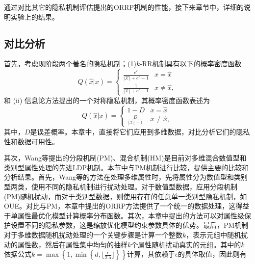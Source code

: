 通过对比其它的隐私机制评估提出的ORRP机制的性能，接下来章节中，详细的说明实验上的结果。

\subsection{对比分析}

首先，考虑现阶段两个著名的隐私机制；(1)$k$-RR\cite{kairouz2016extremal}机制具有以下的概率密度函数
\begin{equation}
	Q(\hat{x}|x)=
	\begin{cases}
		\frac{e^{\epsilon}}{|\mathcal{X}|+e^{\epsilon}-1} & \text{$x=\hat{x}$}\\
		\frac{1}{|\mathcal{X}|+e^{\epsilon}-1} & \text{$x\neq\hat{x}$},
	\end{cases}
\end{equation}
和 (ii) 信息论方法提出的一个对称隐私机制\cite{sarwate2014a,kalantari2018robust}，其概率密度函数表述为
\begin{equation}
	Q(\hat{x}|x)=
	\begin{cases}
		1-D & \text{$x=\hat{x}$}\\
		\frac{D}{|\mathcal{X}|-1} & \text{$x\neq\hat{x}$},
	\end{cases}
\end{equation}
其中，$D$是误差概率。本章中，直接将它们应用到多维数据，对比分析它们的隐私性和数据可用性。





其次，Wang等\cite{wang2019collecting}提出的分段机制(PM)、混合机制(HM)是目前对多维混合数值型和类别型属性处理的先进LDP机制。本节中与PM机制进行比较，提供主要的比较和分析结果。首先，Wang等的方法在处理多维属性时，先将属性分为数值型和类别型两类，使用不同的隐私机制进行扰动处理。对于数值型数据，应用分段机制(PM)随机扰动，而对于类别型数据，则使用存在的任意单一类别型隐私机制，如OUE。对比与PM，本章中提出的ORRP方法提供了一个统一的数据处理，这得益于单属性最优化模型计算概率分布函数。其次，本章中提出的方法可以对属性级保护设置不同的隐私参数，这是缩放优化模型约束参数具体的优势。最后，PM机制对于多维数据随机扰动处理的一个关键步骤是计算一个整数$k$，表示元组中随机扰动的属性数，然后在属性集中均匀的抽样$k$个属性随机扰动真实的元组。其中的$k$依据公式$k=\max\left\{1,\min\left\{d,\lfloor\frac{\epsilon}{2.5}\rfloor\right\}\right\}$计算，其依赖于$\epsilon$的具体取值，因此则有

